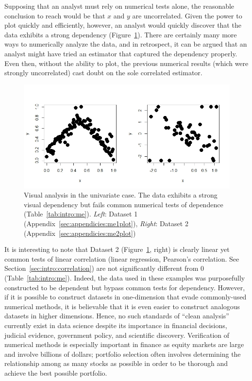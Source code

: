 Supposing that an analyst must rely on numerical tests alone, the reasonable conclusion to reach would be that $x$ and $y$ are uncorrelated. Given the power to plot quickly and efficiently, however, an analyst would quickly discover that the data exhibits a strong dependency (Figure~\ref{fig:intro:meplot}). There are certainly many more ways to numerically analyze the data, and in retrospect, it can be argued that an analyst might have tried an estimator that captured the dependency properly. Even then, without the ability to plot, the previous numerical results (which were strongly uncorrelated) cast doubt on the sole correlated estimator.

\begin{figure}[htb]
	\begin{center}
		\includegraphics[width=1\linewidth]{ch-intro/figures/me}
		\caption[Visual analysis in the univariate case.]{Visual analysis in the univariate case. The data exhibits a strong visual dependency but fails common numerical tests of dependence (Table~\ref{tab:intro:me}). \textit{Left}: Dataset 1 (Appendix~\ref{sec:appendicies:me1plot}), \textit{Right}: Dataset 2 (Appendix~\ref{sec:appendicies:me2plot})}
		\label{fig:intro:meplot}
	\end{center}
\end{figure}

It is interesting to note that Dataset 2 (Figure~\ref{fig:intro:meplot}, right) is clearly linear yet common tests of linear correlation (linear regression, Pearson's correlation. See Section~\ref{sec:intro:correlation}) are not significantly different from 0 (Table~\ref{tab:intro:me}). Indeed, the data used in these examples was purposefully constructed to be dependent but bypass common tests for dependency. However, if it is possible to construct datasets in one-dimension that evade commonly-used numerical methods, it is believable that it is even easier to construct analogous datasets in higher dimensions. Hence, no such standards of ``clean analysis'' currently exist in data science despite its importance in financial decisions, judicial evidence, government policy, and scientific discovery. Verification of numerical methods is especially important in finance as equity markets are large and involve billions of dollars; portfolio selection often involves determining the relationship among as many stocks as possible in order to be thorough and achieve the best possible portfolio. 